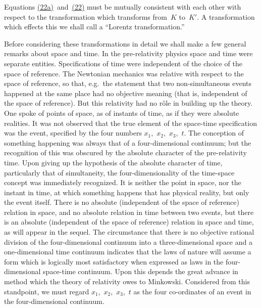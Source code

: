 \documentclass[12pt]{book}[2005/09/16]
\newcommand{\PageSep}[1]{\ignorespaces}
\newcommand{\Eqref}[1]{\hyperref[eqn:#1]{#1}}
\begin{document}
Equations \Eqref{(22a)}~and~\Eqref{(22)} must be mutually consistent
with each other with respect to the transformation which
transforms from~$K$ to~$K'$. A transformation which effects
this we shall call a ``Lorentz transformation.''
%

Before considering these transformations in detail we
\PageSep{33}
shall make a few general remarks about space and time.
In the pre-relativity physics space and time were separate
entities. Specifications of time were independent of
the choice of the space of reference. The Newtonian
mechanics was relative with respect to the space of
reference, so that, e.g.~the statement that two non-simultaneous
events happened at the same place had no objective
meaning (that is, independent of the space of reference).
But this relativity had no rôle in building up the theory.
One spoke of points of space, as of instants of time, as if
they were absolute realities. It was not observed that
the true element of the space-time specification was the
event, specified by the four numbers $x_{1}$,~$x_{2}$,~$x_{3}$,~$t$. The
conception of something happening was always that of a
four-dimensional continuum; but the recognition of this
%
%
was obscured by the absolute character of the pre-relativity
time. Upon giving up the hypothesis of the absolute
character of time, particularly that of simultaneity, the
four-dimensionality of the time-space concept was immediately
%
recognized. It is neither the point in space,
nor the instant in time, at which something happens that
has physical reality, but only the event itself. There is
no absolute (independent of the space of reference) relation
in space, and no absolute relation in time between two
events, but there is an absolute (independent of the space
of reference) relation in space and time, as will appear in
the sequel. The circumstance that there is no objective
rational division of the four-dimensional continuum into
a three-dimensional space and a one-dimensional time
continuum indicates that the laws of nature will assume
\PageSep{34}
a form which is logically most satisfactory when expressed
as laws in the four-dimensional space-time continuum.
Upon this depends the great advance in method which
the theory of relativity owes to Minkowski. Considered
%
from this standpoint, we must regard $x_{1}$,~$x_{2}$,~$x_{3}$,~$t$ as the
four co-ordinates of an event in the four-dimensional continuum.
\end{document}
